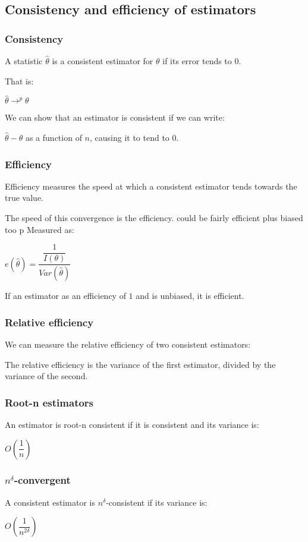 
\subsection{Consistency and efficiency of estimators}

\subsubsection{Consistency}

A statistic \(\hat \theta \) is a consistent estimator for \(\theta \) if its error tends to \(0\).

That is:

\(\hat \theta\rightarrow^p \theta \)

We can show that an estimator is consistent if we can write:

\(\hat \theta -\theta \) as a function of \(n\), causing it to tend to \(0\).

\subsubsection{Efficiency}

Efficiency measures the speed at which a consistent estimator tends towards the true value.

The speed of this convergence is the efficiency. could be fairly efficient plus biased too	p Measured as:

\(e(\hat \theta )=\dfrac{\dfrac{1}{I(\theta )}}{Var (\hat \theta )}\)

If an estimator as an efficiency of \(1\) and is unbiased, it is efficient.

\subsubsection{Relative efficiency}

We can measure the relative efficiency of two consistent estimators:

The relative efficiency is the variance of the first estimator, divided by the variance of the second.

\subsubsection{Root-n estimators}

An estimator is root-n consistent if it is consistent and its variance is:

\(O(\dfrac{1}{n})\)

\subsubsection{\(n^\delta \)-convergent}

A consistent estimator is \(n^\delta \)-consistent if its variance is:

\(O(\dfrac{1}{n^{2 \delta }})\)

